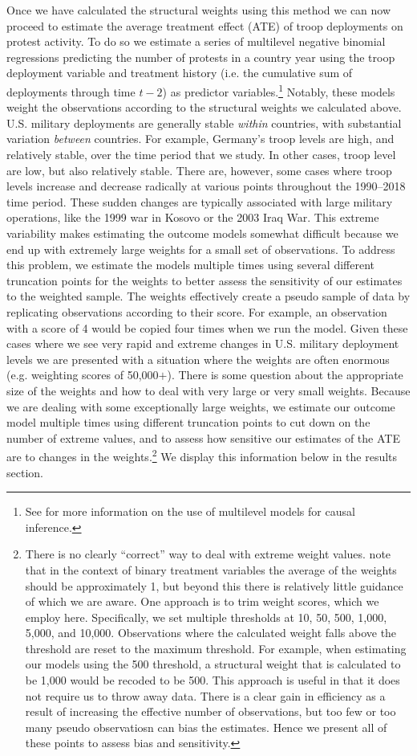 Once we have calculated the structural weights using this method we can now proceed to estimate the average treatment effect (ATE) of troop deployments on protest activity. To do so we estimate a series of multilevel negative binomial regressions predicting the number of protests in a country year using the troop deployment variable and treatment history (i.e. the cumulative sum of deployments through time $t-2$) as predictor variables.\footnote{See  for more information on the use of multilevel models for causal inference.}  Notably, these models weight the observations according to the structural weights we calculated above. U.S. military deployments are generally stable \textit{within} countries, with substantial variation \textit{between} countries. For example, Germany's troop levels are high, and relatively stable, over the time period that we study. In other cases, troop level are low, but also relatively stable. There are, however, some cases where troop levels increase and decrease radically at various points throughout the 1990--2018 time period. These sudden changes are typically associated with large military operations, like the 1999 war in Kosovo or the 2003 Iraq War. This extreme variability makes estimating the outcome models somewhat difficult because we end up with extremely large weights for a small set of observations. To address this problem, we estimate the models multiple times using several different truncation points for the weights to better assess the sensitivity of our estimates to the weighted sample. The weights effectively create a pseudo sample of data by replicating observations according to their score. For example, an observation with a score of 4 would be copied four times when we run the model. Given these cases where we see very rapid and extreme changes in U.S. military deployment levels we are presented with a situation where the weights are often enormous (e.g. weighting scores of 50,000$+$). There is some question about the appropriate size of the weights and how to deal with very large or very small weights. Because we are dealing with some exceptionally large weights, we estimate our outcome model multiple times using different truncation points to cut down on the number of extreme values, and to assess how sensitive our estimates of the ATE are to changes in the weights.\footnote{There is no clearly ``correct'' way to deal with extreme weight values.  note that in the context of binary treatment variables the average of the weights should be approximately 1, but beyond this there is relatively little guidance of which we are aware. One approach is to trim weight scores, which we employ here. Specifically, we set multiple thresholds at 10, 50, 500, 1,000, 5,000, and 10,000. Observations where the calculated weight falls above the threshold are reset to the maximum threshold. For example, when estimating our models using the 500 threshold, a structural weight that is calculated to be 1,000 would be recoded to be 500. This approach is useful in that it does not require us to throw away data. There is a clear gain in efficiency as a result of increasing the effective number of observations, but too few or too many pseudo observatiosn can bias the estimates. Hence we present all of these points to assess bias and sensitivity.} We display this information below in the results section.



